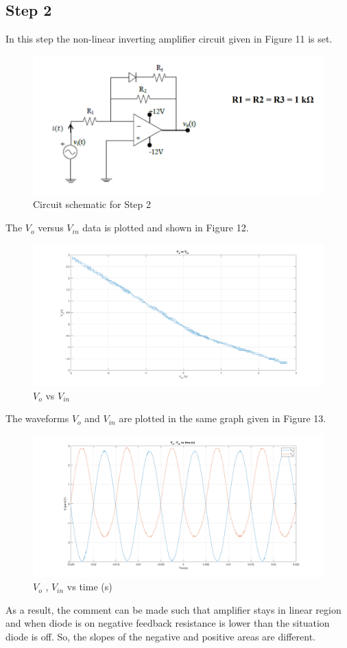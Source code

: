 \documentclass[letterpaper,12pt]{article}
\begin{document}
\subsection{Step 2}
In this step the non-linear inverting amplifier circuit given in Figure 11 is set. 
\begin{figure}[H]
	\centering
   \includegraphics[width=1\textwidth]{circuit_2.png}
   \caption{Circuit schematic for Step 2}
\end{figure}
The \(V_{o}\) versus \(V_{in}\) data is plotted and shown in Figure 12. 

\begin{figure}[H]
	\centering
   \includegraphics[width=1\textwidth]{2_1.png}
   \caption{\(V_{o}\) vs \(V_{in}\)}
\end{figure}
The waveforms \(V_{o}\) and \(V_{in}\) are plotted in the same graph given in Figure 13.
\begin{figure}[H]
	\centering
   \includegraphics[width=1\textwidth]{2_2.png}
   \caption{\(V_{o}\) , \(V_{in}\) vs time (s) }
\end{figure}
As a result, the comment can be made such that amplifier stays in linear region and when diode is on negative feedback resistance is lower than the situation diode is off. So, the slopes of the negative and positive areas are different.
\end{document}
